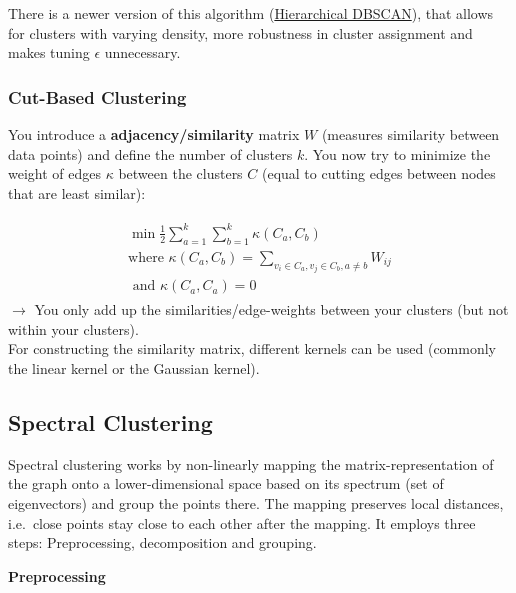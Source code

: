 \documentclass[
]{book}
\begin{document}
There is a newer version of this algorithm (\href{https://hdbscan.readthedocs.io/en/latest/basic_hdbscan.html}{Hierarchical
DBSCAN}),
that allows for clusters with varying density, more robustness in
cluster assignment and makes tuning \(\epsilon\) unnecessary.

\hypertarget{cut-based-clustering}{%
\subsubsection{Cut-Based Clustering}\label{cut-based-clustering}}

You introduce a \textbf{adjacency/similarity} matrix \(W\) (measures similarity
between data points) and define the number of clusters \(k\). You now try
to minimize the weight of edges \(\kappa\) between the clusters \(C\) (equal
to cutting edges between nodes that are least similar):

\[\begin{aligned}
                \begin{split}  
                    \min \frac{1}{2} \sum_{a=1}^k \sum_{b=1}^k \kappa(C_a, C_b) \\
                    \text{where } \kappa(C_a, C_b) = \sum_{v_i \in C_a , v_j \in C_b , a \neq b} W_{ij} \\ 
                    \text{ and } \kappa(C_a, C_a) = 0
                \end{split}
            \end{aligned}\] \(\rightarrow\) You only add up the
similarities/edge-weights between your clusters (but not within your
clusters).\\
For constructing the similarity matrix, different kernels can be used
(commonly the linear kernel or the Gaussian kernel).

\hypertarget{spectral-clustering}{%
\subsection{Spectral Clustering}\label{spectral-clustering}}

Spectral clustering works by non-linearly mapping the
matrix-representation of the graph onto a lower-dimensional space based
on its spectrum (set of eigenvectors) and group the points there. The
mapping preserves local distances, i.e.~close points stay close to each
other after the mapping. It employs three steps: Preprocessing,
decomposition and grouping.

\textbf{Preprocessing}
\end{document}
